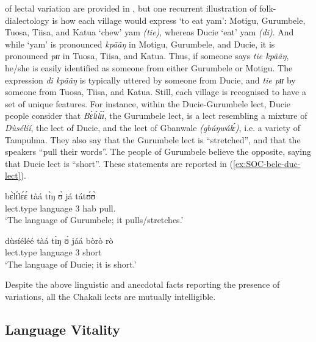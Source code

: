 of lectal variation are provided in \citet{brin15c}, but one recurrent 
illustration of folk-dialectology  is  how each village would express `to 
eat yam':   Motigu, Gurumbele, Tuosa, Tiisa,  and Katua  `chew' yam {\it 
(tie)}, 
whereas Ducie  `eat' yam {\it (di)}.  And while `yam' is pronounced {\it 
kpããŋ} in Motigu, Gurumbele,  and Ducie, it is pronounced {\it pɪɪ} in Tuosa, 
Tiisa,  and Katua. Thus, if someone says {\it tie kpããŋ}, he/she is 
easily identified as someone from either Gurumbele or Motigu.  The expression 
{\it di kpããŋ} is typically uttered by someone from  Ducie,  and {\it tie pɪɪ} 
by someone from Tuosa,  Tiisa, and Katua.  Still, each village is recognised to 
have a set of unique features. For instance, within the Ducie-Gurumbele lect, 
Ducie people consider that {\it Bɛ̀lɪ́lɪ́ɪ́}, the Gurumbele lect,  is a lect 
resembling a mixture of {\it Dùsélíí}, the lect of Ducie, and the lect 
of Gbanwale {\it (gbúŋwálɛ́)}, i.e. a variety of Tampulma. They also say that 
the Gurumbele lect is ``stretched'', and that the speakers ``pull their 
words''. The 
people of Gurumbele believe the opposite, saying that Ducie lect  is 
 ``short''.  These statements are  reported in (\ref{ex:SOC-bele-duc-lect}). 



\begin{exe}
 \ex\label{ex:SOC-bele-duc-lect}
\begin{xlist}
 \ex\label{ex:SOC-bele-lect}
\gll bɛ̀lɪ́lɛ́ɛ́ tàá tɪ̀ŋ ʊ̀ já tátʊ́ʊ̀\\
lect.type language {\art} {3\sg} {\sc hab} pull.{\foc}\\
\glt `The language of Gurumbele; it pulls/stretches.'

 \ex\label{ex:SOC-ducie-lect}
\gll dùsíéléé tàá tɪ̀ŋ ʊ̀ jáá bòrò rò\\
lect.type language {\art} {3\sg} {\ident}  short {\foc}\\
\glt `The language of Ducie; it is short.'
\end{xlist}
\end{exe}

Despite the above linguistic and anecdotal facts reporting the presence 
of variations,  all the Chakali lects are mutually intelligible.


\subsection{Language Vitality}
\label{sec:vital}

